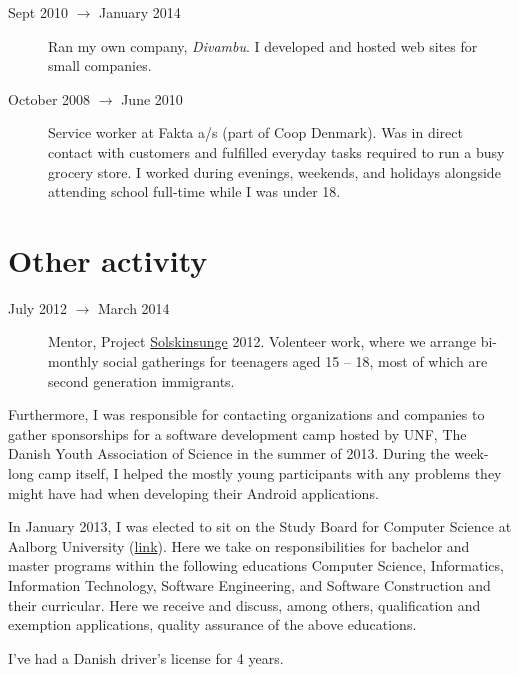 \documentclass[margin,line,a4paper]{resume}
\begin{document}
\begin{resume}
\begin{description}
  \item[Sept 2010 $\rightarrow$ January 2014] Ran my own company,
    \emph{Divambu}. I developed and hosted web sites for small companies.

  \item[October 2008 $\rightarrow$ June 2010] Service worker at
    Fakta a/s (part of Coop Denmark). Was in direct contact with customers
    and fulfilled everyday tasks required to run a busy grocery store. I
    worked during evenings, weekends, and holidays alongside attending
    school full-time while I was under 18.
\end{description}

\section{\mysidestyle Other activity}\vspace{1mm}
\begin{description}
  \item[July 2012 $\rightarrow$ March 2014] Mentor, Project
    \href{http://www.urk.dk/solskinsunge/}{Solskinsunge} 2012. Volenteer
    work, where we arrange bi-monthly social gatherings for teenagers aged
    15 -- 18, most of which are second generation immigrants.
\end{description}
Furthermore, I was responsible for contacting organizations and
companies to gather sponsorships for a software development camp hosted
by UNF, The Danish Youth Association of Science in the summer of 2013.
During the week-long camp itself, I helped the mostly young participants
with any problems they might have had when developing their Android
applications.

In January 2013, I was elected to sit on the Study
Board for Computer Science at Aalborg University
(\href{http://www.en.sict.aau.dk/Study+board+for+Computer+Science/}{link}).
Here we take on responsibilities for bachelor and master programs
within the following educations Computer Science, Informatics,
Information Technology, Software Engineering, and Software Construction
and their curricular. Here we receive and discuss, among others,
qualification and exemption applications, quality assurance of the above
educations.

I've had a Danish driver's license for 4 years.


\end{resume}
\end{document}
